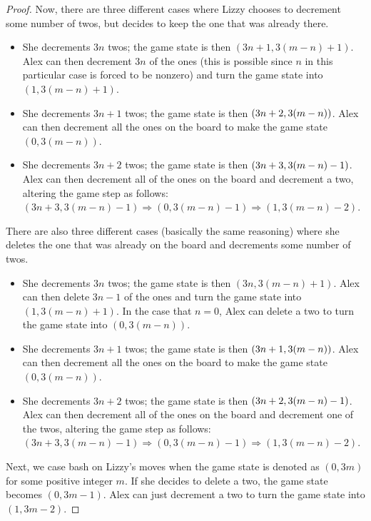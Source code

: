 \documentclass[10pt]{../usamts}
\begin{document}
\begin{solution}
\begin{proof}
    Now, there are three different cases where Lizzy chooses to decrement some number of twos, but decides to keep the one that was already there.
    \begin{itemize}
        \item She decrements $3n$ twos; the game state is then $(3n+1, 3(m-n)+1)$. Alex can then decrement $3n$ of the ones (this is possible since $n$ in this particular case is forced to be nonzero) and turn the game state into $(1, 3(m-n)+1)$.
        \item She decrements $3n+1$ twos; the game state is then $\left( 3n+2, 3(m-n) \right)$. Alex can then decrement all the ones on the board to make the game state $(0,3(m-n))$.
        \item She decrements $3n+2$ twos; the game state is then $\left( 3n+3, 3(m-n)-1 \right)$. Alex can then decrement all of the ones on the board and decrement a two, altering the game step as follows: $(3n+3, 3(m-n)-1) \Rightarrow (0,3(m-n)-1) \Rightarrow (1, 3(m-n)-2)$.
    \end{itemize}
    There are also three different cases (basically the same reasoning) where she deletes the one that was already on the board and decrements some number of twos.
    \begin{itemize}
        \item She decrements $3n$ twos; the game state is then $(3n, 3(m-n)+1)$. Alex can then delete $3n-1$ of the ones and turn the game state into $(1, 3(m-n)+1)$. In the case that $n=0$, Alex can delete a two to turn the game state into $(0, 3(m-n))$.
        \item She decrements $3n+1$ twos; the game state is then $\left( 3n+1, 3(m-n) \right)$. Alex can then decrement all the ones on the board to make the game state $(0,3(m-n))$.
        \item She decrements $3n+2$ twos; the game state is then $\left( 3n+2, 3(m-n)-1 \right)$. Alex can then decrement all of the ones on the board and decrement one of the twos, altering the game step as follows: $(3n+3, 3(m-n)-1) \Rightarrow (0,3(m-n)-1) \Rightarrow (1, 3(m-n)-2)$.
    \end{itemize}

    Next, we case bash on Lizzy's moves when the game state is denoted as $(0, 3m)$ for some positive integer $m$.
    If she decides to delete a two, the game state becomes $(0, 3m-1)$. Alex can just decrement a two to turn the game state into $(1, 3m-2)$.


\end{proof}
\end{solution}
\end{document}
